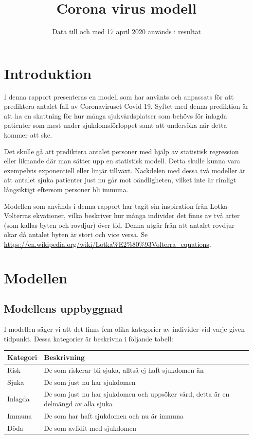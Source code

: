 \documentclass[a4paper, 12pt]{article}
\title{Corona virus modell}
\author{}
\date{Data till och med 17 april 2020 används i resultat} %
\theoremstyle{definition}
\begin{document}
\maketitle
\section{Introduktion}
I denna rapport presenteras en modell som har använts och anpassats för att prediktera antalet fall av Coronaviruset Covid-19. Syftet med denna prediktion är att ha en skattning för hur många sjukvårdsplatser som behövs för inlagda patienter som mest under sjukdomsförloppet samt att undersöka när detta kommer att ske.

Det skulle gå att prediktera antalet personer med hjälp av statistisk regression eller liknande där man sätter upp en statistisk modell. Detta skulle kunna vara exempelvis exponentiell eller linjär tillväxt. Nackdelen med dessa två modeller är att antalet sjuka patienter just nu går mot oändligheten, vilket inte är rimligt långsiktigt eftersom personer bli immuna.

Modellen som används i denna rapport har tagit sin inspiration från Lotka-Volterras ekvationer, vilka beskriver hur många individer det finns av två arter (som kallas byten och rovdjur) över tid. Denna utgår från att antalet rovdjur ökar då antalet byten är stort och vice versa. Se \url{https://en.wikipedia.org/wiki/Lotka%E2%80%93Volterra_equations}.

\section{Modellen}
\subsection{Modellens uppbyggnad}
I modellen säger vi att det finns fem olika kategorier av individer vid varje given tidpunkt. Dessa kategorier är beskrivna i följande tabell:

\begin{center}
  \begin{tabular}{p{3cm} | p{8cm}}
    \textbf{Kategori} & \textbf{Beskrivning} \\ \hline
    Risk & De som riskerar bli sjuka, alltså ej haft sjukdomen än \\ \hline
    Sjuka & De som just nu har sjukdomen \\ \hline
    Inlagda & De som just nu har sjukdomen och uppsöker vård, detta är en delmängd av alla sjuka \\ \hline
    Immuna & De som har haft sjukdomen och nu är immuna \\ \hline
    Döda & De som avlidit med sjukdomen
  \end{tabular}
\end{center}
\end{document}
